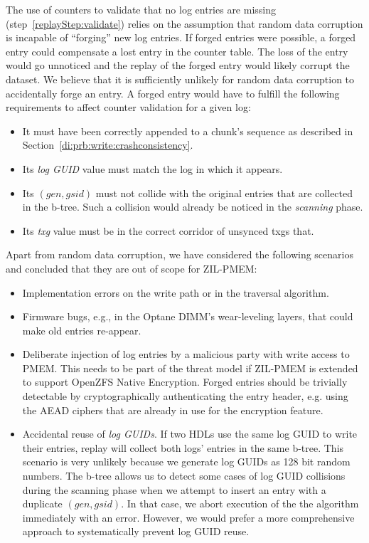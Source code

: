 \documentclass[12pt,a4paper,twoside]{book}
\begin{document}
The use of counters to validate that no log entries are missing (step~\ref{replayStep:validate}) relies on the assumption that random data corruption is incapable of ``forging'' new log entries.
If forged entries were possible, a forged entry could compensate a lost entry in the counter table.
The loss of the entry would go unnoticed and the replay of the forged entry would likely corrupt the dataset.
We believe that it is sufficiently unlikely for random data corruption to accidentally forge an entry.
A forged entry would have to fulfill the following requirements to affect counter validation for a given log:
\begin{itemize}[noitemsep]
    \item It must have been correctly appended to a chunk's sequence as described in Section~\ref{di:prb:write:crashconsistency}.
    \item Its \textit{log GUID} value must match the log in which it appears.
    \item Its $(gen, gsid)$ must not collide with the original entries that are collected in the b-tree. Such a collision would already be noticed in the \textit{scanning} phase.
    \item Its \textit{txg} value must be in the correct corridor of unsynced txgs that.
\end{itemize}
Apart from random data corruption, we have considered the following scenarios and concluded that they are out of scope for ZIL-PMEM:
\begin{itemize}[noitemsep]
\item Implementation errors on the write path or in the traversal algorithm.
\item Firmware bugs, e.g., in the Optane DIMM's wear-leveling layers, that could make old entries re-appear.
\item Deliberate injection of log entries by a malicious party with write access to PMEM.
    This needs to be part of the threat model if ZIL-PMEM is extended to support OpenZFS Native Encryption.
    Forged entries should be trivially detectable by cryptographically authenticating the entry header, e.g. using the AEAD ciphers that are already in use for the encryption feature.
\item Accidental reuse of \textit{log GUIDs}.
    If two HDLs use the same log GUID to write their entries, replay will collect both logs' entries in the same b-tree.
    This scenario is very unlikely because we generate log GUIDs as 128 bit random numbers.
    The b-tree allows us to detect some cases of log GUID collisions during the scanning phase when we attempt to insert an entry with a duplicate $(gen, gsid)$.
    In that case, we abort execution of the the algorithm immediately with an error.
    However, we would prefer a more comprehensive approach to systematically prevent log GUID reuse.
\end{itemize}
\end{document}
